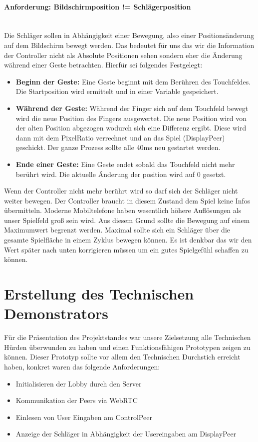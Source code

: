\paragraph{Anforderung: Bildschirmposition != Schlägerposition}
\mbox{}\\
Die Schläger sollen in Abhängigkeit einer Bewegung, also einer Positionsänderung auf dem Bildschirm bewegt werden. Das bedeutet für uns das wir die Information der Controller nicht als Absolute Positionen sehen sondern eher die Änderung während einer Geste betrachten.
\newline
Hierfür sei folgendes Festgelegt:
\begin{itemize}
	\item 
	      \textbf{Beginn der Geste:} Eine Geste beginnt mit dem Berühren des Touchfeldes. Die Startposition wird ermittelt und in einer Variable gespeichert.
	\item
	      \textbf{Während der Geste:} Während der Finger sich auf dem Touchfeld bewegt wird die neue Position des Fingers ausgewertet. Die neue Position wird von der alten Position abgezogen wodurch sich eine Differenz ergibt. Diese wird dann mit dem PixelRatio verrechnet und an das Spiel (DisplayPeer) geschickt.
	      \newline
	      Der ganze Prozess sollte alle 40ms neu gestartet werden.
	\item
	      \textbf{Ende einer Geste: } Eine Geste endet sobald das Touchfeld nicht mehr berührt wird. Die aktuelle Änderung der position wird auf 0 gesetzt.
\end{itemize}
Wenn der Controller nicht mehr berührt wird so darf sich der Schläger nicht weiter bewegen. Der Controller braucht in diesem Zustand dem Spiel keine Infos übermitteln.
\newline
Moderne Mobiltelefone haben wesentlich höhere Auflösungen als unser Spielfeld groß sein wird. Aus diesem Grund sollte die Bewegung auf einem Maximumwert begrenzt werden.
\newline 
Maximal sollte sich ein Schläger über die gesamte Spielfläche in einem Zyklus bewegen können. Es ist denkbar das wir den Wert später nach unten korrigieren müssen um ein gutes Spielgefühl schaffen zu können.
\newpage
\section{Erstellung des Technischen Demonstrators}
Für die Präsentation des Projektstandes war unsere Zielsetzung alle Technischen Hürden überwunden zu haben und einen Funktionsfähigen Prototypen zeigen zu können.
\newline
Dieser Prototyp sollte vor allem den Technischen Durchstich erreicht haben, konkret waren das folgende Anforderungen:
\begin{itemize}
	\item
	      Initialisieren der Lobby durch den Server
	\item
	      Kommunikation der Peers via WebRTC
	\item
	      Einlesen von User Eingaben am ControlPeer
	\item
	      Anzeige der Schläger in Abhängigkeit der Usereingaben am DisplayPeer
\end{itemize}
